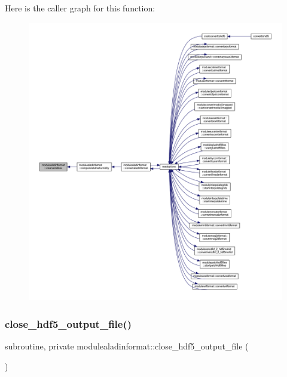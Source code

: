 Here is the caller graph for this function\+:\nopagebreak
\begin{figure}[H]
\begin{center}
\leavevmode
\includegraphics[width=350pt]{namespacemodulealadinformat_abe2227188275639d4c746fc709d090e2_icgraph}
\end{center}
\end{figure}
\mbox{\label{namespacemodulealadinformat_af21c9df5cd692b1f56a959cc52cba7d8}} 
\subsubsection{\texorpdfstring{close\+\_\+hdf5\+\_\+output\+\_\+file()}{close\_hdf5\_output\_file()}}
{\footnotesize\ttfamily subroutine, private modulealadinformat\+::close\+\_\+hdf5\+\_\+output\+\_\+file (\begin{DoxyParamCaption}{ }\end{DoxyParamCaption})\hspace{0.3cm}{\ttfamily [private]}}

